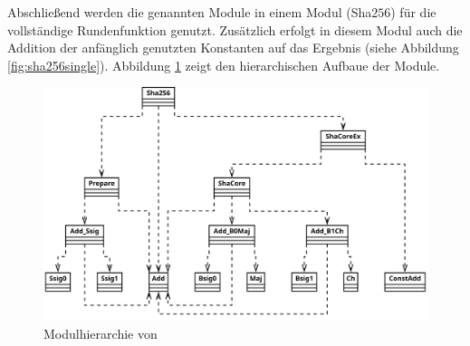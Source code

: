 Abschließend werden die genannten Module in einem Modul (Sha$256$) für die vollständige Rundenfunktion genutzt. Zusätzlich erfolgt in
diesem Modul auch die Addition der anfänglich genutzten Konstanten auf das Ergebnis (siehe Abbildung \ref{fig:sha256single}).
Abbildung \ref{fig:sha256_module} zeigt den hierarchischen Aufbaue der Module.
\begin{figure}[!h]
  \centering
  \includegraphics[scale=0.265]{images/module}
  \caption{Modulhierarchie von }
  \label{fig:sha256_module}
\end{figure}